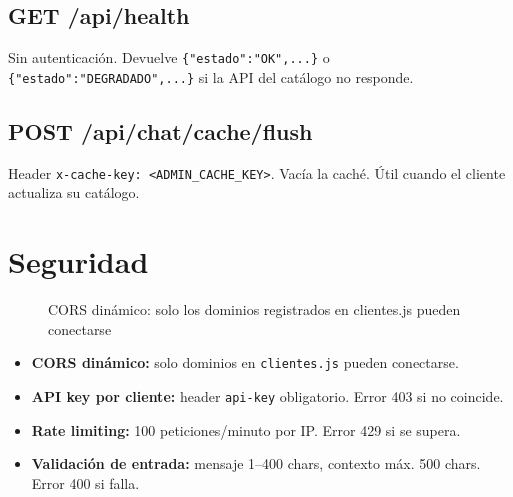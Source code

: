 \documentclass[12pt, a4paper]{article}
\begin{document}
\subsection{GET /api/health}

Sin autenticación. Devuelve \verb|{"estado":"OK",...}| o \verb|{"estado":"DEGRADADO",...}| si la API del catálogo no responde.

\subsection{POST /api/chat/cache/flush}

Header \texttt{x-cache-key: <ADMIN\_CACHE\_KEY>}. Vacía la caché. Útil cuando el cliente actualiza su catálogo.

\section{Seguridad}

\begin{figure}[h]
\centering
{}
\caption{CORS dinámico: solo los dominios registrados en clientes.js pueden conectarse}
\end{figure}

\begin{itemize}[noitemsep]
  \item \textbf{CORS dinámico:} solo dominios en \texttt{clientes.js} pueden conectarse.
  \item \textbf{API key por cliente:} header \texttt{api-key} obligatorio. Error 403 si no coincide.
  \item \textbf{Rate limiting:} 100 peticiones/minuto por IP. Error 429 si se supera.
  \item \textbf{Validación de entrada:} mensaje 1--400 chars, contexto máx. 500 chars. Error 400 si falla.
\end{itemize}
\end{document}
